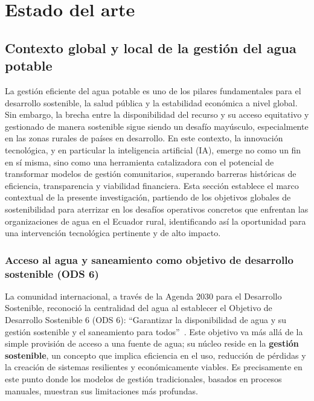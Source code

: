 \chapter{Estado del arte}
\label{ch:theoretical_framework}

\section{Contexto global y local de la gestión del agua potable}
\label{sec:global_local_context}

La gestión eficiente del agua potable es uno de los pilares fundamentales para el desarrollo sostenible, la salud pública y la estabilidad económica a nivel global. Sin embargo, la brecha entre la disponibilidad del recurso y su acceso equitativo y gestionado de manera sostenible sigue siendo un desafío mayúsculo, especialmente en las zonas rurales de países en desarrollo. En este contexto, la innovación tecnológica, y en particular la inteligencia artificial (IA), emerge no como un fin en sí misma, sino como una herramienta catalizadora con el potencial de transformar modelos de gestión comunitarios, superando barreras históricas de eficiencia, transparencia y viabilidad financiera. Esta sección establece el marco contextual de la presente investigación, partiendo de los objetivos globales de sostenibilidad para aterrizar en los desafíos operativos concretos que enfrentan las organizaciones de agua en el Ecuador rural, identificando así la oportunidad para una intervención tecnológica pertinente y de alto impacto.

\subsection{Acceso al agua y saneamiento como objetivo de desarrollo sostenible (ODS 6)}
\label{subsec:ods6}

La comunidad internacional, a través de la Agenda 2030 para el Desarrollo Sostenible, reconoció la centralidad del agua al establecer el Objetivo de Desarrollo Sostenible 6 (ODS 6): ``Garantizar la disponibilidad de agua y su gestión sostenible y el saneamiento para todos''~\parencite{NacionesUnidas2015}. Este objetivo va más allá de la simple provisión de acceso a una fuente de agua; su núcleo reside en la \textbf{gestión sostenible}, un concepto que implica eficiencia en el uso, reducción de pérdidas y la creación de sistemas resilientes y económicamente viables. Es precisamente en este punto donde los modelos de gestión tradicionales, basados en procesos manuales, muestran sus limitaciones más profundas.

